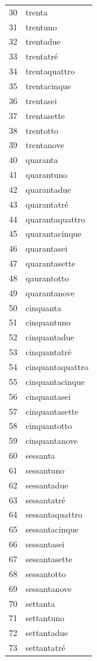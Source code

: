 \documentclass[10pt]{scrartcl}
\begin{document}
\begin{multicols*}{2}
\begin{supertabular}{p{4cm}p{4cm}}
30 & trenta\\
31 & trentuno\\
32 & trentadue\\
33 & trentatré\\
34 & trentaquattro\\
35 & trentacinque\\
36 & trentasei\\
37 & trentasette\\
38 & trentotto\\
39 & trentanove\\
40 & quaranta\\
41 & quarantuno\\
42 & quarantadue\\
43 & quarantatré\\
44 & quarantaquattro\\
45 & quarantacinque\\
46 & quarantasei\\
47 & quarantasette\\
48 & qaurantotto\\
49 & quarantanove\\
50 & cinquanta\\
51 & cinquantuno\\
52 & cinquantadue\\
53 & cinquantatré\\
54 & cinquantaquattro\\
55 & cinquantacinque\\
56 & cinquantasei\\
57 & cinquantasette\\
58 & cinquantotto\\
59 & cinquantanove\\
60 & sessanta\\
61 & sessantuno\\
62 & sessantadue\\
63 & sessantatré\\
64 & sessantaquattro\\
65 & sessantacinque\\
66 & sessantasei\\
67 & sessantasette\\
68 & sessantotto\\
69 & sessantanove\\
70 & settanta\\
71 & settantuno\\
72 & settantadue\\
73 & settantatré\\

\end{supertabular}
\end{multicols*}
\end{document}
